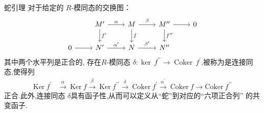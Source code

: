 \documentclass[../../几何与拓扑.tex]{subfiles}
\begin{document}
\begin{lemma}{蛇引理}
    对于给定的 \(  R  \)-模同态的交换图：
    \[\begin{tikzcd}
	& {M^{\prime}} & M & {M^{\prime\prime}} & 0 \\
	0 & {N^{\prime}} & N & {N^{\prime\prime}}
	\arrow["\alpha", from=1-2, to=1-3]
	\arrow["{f^{\prime}}", from=1-2, to=2-2]
	\arrow["\beta", from=1-3, to=1-4]
	\arrow["f", from=1-3, to=2-3]
	\arrow[from=1-4, to=1-5]
	\arrow["{f^{\prime\prime}}", from=1-4, to=2-4]
	\arrow[from=2-1, to=2-2]
	\arrow["{\alpha^{\prime}}", from=2-2, to=2-3]
	\arrow["{\beta^{\prime}}", from=2-3, to=2-4]
\end{tikzcd}\]
    其中两个水平列是正合的, 存在\(  R  \)-模同态 \(   \delta  : \operatorname{ker}\,f ^{\prime \prime} \to \operatorname{Coker}\,f^{\prime}   \),被称为是连接同态,使得列
    \[
        \begin{aligned}\mathrm{Ker~}f^{\prime}&\xrightarrow{\alpha}\mathrm{~Ker~}f\xrightarrow{\beta}\mathrm{~Ker~}f^{\prime\prime}\xrightarrow{\delta}\mathrm{~Coker~}f^{\prime}\xrightarrow{\alpha^{\prime}}\mathrm{~Coker~}f\longrightarrow\mathrm{Coker~}f^{\prime\prime}\end{aligned}
    \]正合.此外,连接同态 \(   \delta    \)具有函子性,从而可以定义从“蛇”到对应的“六项正合列”   的共变函子.
\end{lemma}
\end{document}
